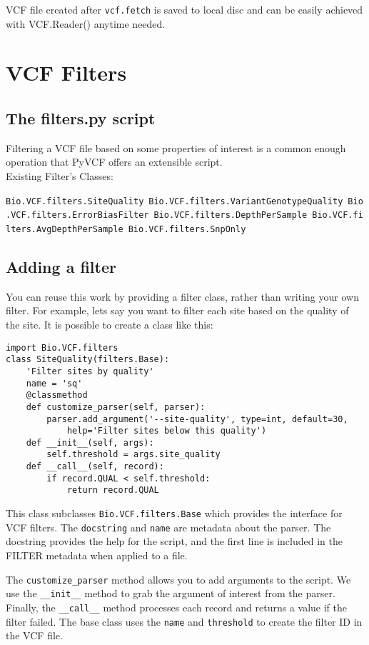 \noindent VCF file created after \verb|vcf.fetch| is saved to local disc and can be easily achieved with
VCF.Reader() anytime needed.



\section{VCF Filters}

\subsection{The filters.py script}
\noindent Filtering a VCF file based on some properties of interest is a common enough operation that PyVCF offers an extensible script.
\\
\noindent Existing Filter's Classes:

\verb|Bio.VCF.filters.SiteQuality|\
\verb|Bio.VCF.filters.VariantGenotypeQuality|\
\verb|Bio.VCF.filters.ErrorBiasFilter|\
\verb|Bio.VCF.filters.DepthPerSample|\
\verb|Bio.VCF.filters.AvgDepthPerSample|\
\verb|Bio.VCF.filters.SnpOnly|\



\subsection{Adding a filter}
\noindent You can reuse this work by providing a filter class, rather than writing your own filter. For example, lets say you want to filter each site based on the quality of the site. It is possible to create a class like this:
\begin{verbatim}   
import Bio.VCF.filters
class SiteQuality(filters.Base):
    'Filter sites by quality'
    name = 'sq'
    @classmethod
    def customize_parser(self, parser):
        parser.add_argument('--site-quality', type=int, default=30,
            help='Filter sites below this quality')
    def __init__(self, args):
        self.threshold = args.site_quality
    def __call__(self, record):
        if record.QUAL < self.threshold:
            return record.QUAL
\end{verbatim}

\noindent This class subclasses \verb|Bio.VCF.filters.Base| which provides the interface for VCF filters. The \verb|docstring|  and \verb|name| are metadata about the parser. The docstring provides the help for the script, and the first line is included in the FILTER metadata when applied to a file.

\noindent The \verb|customize_parser| method allows you to add arguments to the script. We use the \verb|__init__| method to grab the argument of interest from the parser. Finally, the \verb|__call__| method processes each record and returns a value if the filter failed.  The base class uses the \verb|name| and \verb|threshold| to create the filter ID in the VCF file.

